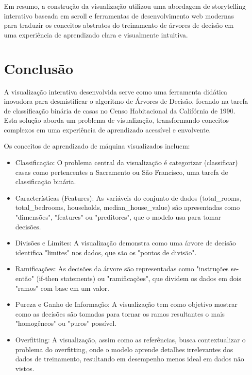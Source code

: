 \documentclass{article}
\begin{document}
Em resumo, a construção da visualização utilizou uma abordagem de storytelling interativo baseada em scroll e 
ferramentas de desenvolvimento web modernas para traduzir os conceitos abstratos do treinamento de árvores de 
decisão em uma experiência de aprendizado clara e visualmente intuitiva.

\section{Conclusão}

A visualização interativa desenvolvida serve como uma ferramenta didática inovadora para desmistificar o 
algoritmo de Árvores de Decisão, focando na tarefa de classificação binária de casas no Censo Habitacional
da Califórnia de 1990. Esta solução aborda um problema de visualização, transformando conceitos complexos 
em uma experiência de aprendizado acessível e envolvente.

Os conceitos de aprendizado de máquina visualizados incluem:

\begin{itemize}
    \item Classificação: O problema central da visualização é categorizar (classificar) casas como pertencentes a 
    Sacramento ou São Francisco, uma tarefa de classificação binária.
    \item Características (Features): As variáveis do conjunto de dados (total\_rooms, total\_bedrooms, households, median\_house\_value)
    são apresentadas como "dimensões", "features" ou "preditores", que o modelo usa para tomar decisões.
    \item Divisões e Limites: A visualização demonstra como uma árvore de decisão identifica "limites" 
    nos dados, que são os "pontos de divisão".
    \item Ramificações: As decisões da árvore são representadas como "instruções se-então" (if-then statements) 
    ou "ramificações", que dividem os dados em dois "ramos" com base em um valor.
    \item Pureza e Ganho de Informação: A visualização tem como objetivo mostrar como as 
    decisões são tomadas para tornar os ramos resultantes o mais "homogêneos" ou "puros" possível. 
    \item Overfitting: A visualização, assim como as referências, busca contextualizar o problema do overfitting, 
    onde o modelo aprende detalhes irrelevantes dos dados de treinamento, resultando em desempenho menos ideal em dados não vistos.
\end{itemize}
\end{document}
